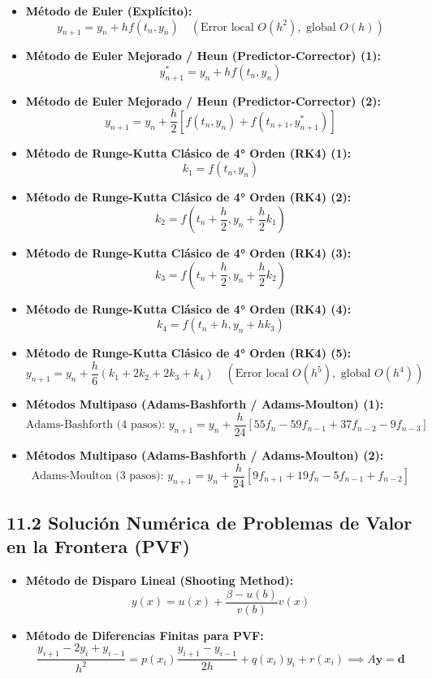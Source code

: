 \documentclass[11pt,a4paper]{article}
\begin{document}
\begin{itemize}
  \item \textbf{Método de Euler (Explícito):}
  \[
    y_{n+1} = y_n + h f(t_n, y_n) \quad (\text{Error local } O(h^2), \text{ global } O(h))
  \]
  \item \textbf{Método de Euler Mejorado / Heun (Predictor-Corrector) (1):}
  \[
    y_{n+1}^* = y_n + h f(t_n, y_n)
  \]
  \item \textbf{Método de Euler Mejorado / Heun (Predictor-Corrector) (2):}
  \[
    y_{n+1} = y_n + \frac{h}{2}[f(t_n, y_n) + f(t_{n+1}, y_{n+1}^*)]
  \]
  \item \textbf{Método de Runge-Kutta Clásico de 4° Orden (RK4) (1):}
  \[
    k_1 = f(t_n, y_n)
  \]
  \item \textbf{Método de Runge-Kutta Clásico de 4° Orden (RK4) (2):}
  \[
    k_2 = f\left(t_n + \frac{h}{2}, y_n + \frac{h}{2}k_1\right)
  \]
  \item \textbf{Método de Runge-Kutta Clásico de 4° Orden (RK4) (3):}
  \[
    k_3 = f\left(t_n + \frac{h}{2}, y_n + \frac{h}{2}k_2\right)
  \]
  \item \textbf{Método de Runge-Kutta Clásico de 4° Orden (RK4) (4):}
  \[
    k_4 = f(t_n + h, y_n + hk_3)
  \]
  \item \textbf{Método de Runge-Kutta Clásico de 4° Orden (RK4) (5):}
  \[
    y_{n+1} = y_n + \frac{h}{6}(k_1 + 2k_2 + 2k_3 + k_4) \quad (\text{Error local } O(h^5), \text{ global } O(h^4))
  \]
  \item \textbf{Métodos Multipaso (Adams-Bashforth / Adams-Moulton) (1):}
  \[
    \text{Adams-Bashforth (4 pasos): } y_{n+1} = y_n + \frac{h}{24}[55f_n - 59f_{n-1} + 37f_{n-2} - 9f_{n-3}]
  \]
  \item \textbf{Métodos Multipaso (Adams-Bashforth / Adams-Moulton) (2):}
  \[
    \text{Adams-Moulton (3 pasos): } y_{n+1} = y_n + \frac{h}{24}[9f_{n+1} + 19f_n - 5f_{n-1} + f_{n-2}]
  \]
\end{itemize}

\subsection*{11.2 Solución Numérica de Problemas de Valor en la Frontera (PVF)}

\begin{itemize}
  \item \textbf{Método de Disparo Lineal (Shooting Method):}
  \[
    y(x) = u(x) + \frac{\beta - u(b)}{v(b)} v(x)
  \]
  \item \textbf{Método de Diferencias Finitas para PVF:}
  \[
    \frac{y_{i+1} - 2y_i + y_{i-1}}{h^2} = p(x_i)\frac{y_{i+1} - y_{i-1}}{2h} + q(x_i)y_i + r(x_i) \implies A\mathbf{y} = \mathbf{d}
  \]
\end{itemize}
\end{document}
